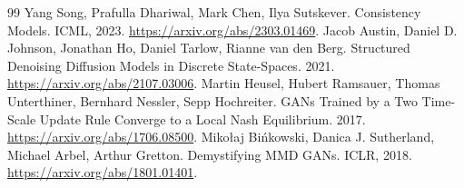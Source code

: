 \documentclass[UTF8,12pt,a4paper,fontset=fandol]{ctexart}
\begin{document}
\begin{thebibliography}{99}
 Yang Song, Prafulla Dhariwal, Mark Chen, Ilya Sutskever. Consistency Models. ICML, 2023. \url{https://arxiv.org/abs/2303.01469}.
 Jacob Austin, Daniel D. Johnson, Jonathan Ho, Daniel Tarlow, Rianne van den Berg. Structured Denoising Diffusion Models in Discrete State-Spaces. 2021. \url{https://arxiv.org/abs/2107.03006}.
 Martin Heusel, Hubert Ramsauer, Thomas Unterthiner, Bernhard Nessler, Sepp Hochreiter. GANs Trained by a Two Time-Scale Update Rule Converge to a Local Nash Equilibrium. 2017. \url{https://arxiv.org/abs/1706.08500}.
 Miko{\l}aj Bi\'nkowski, Danica J. Sutherland, Michael Arbel, Arthur Gretton. Demystifying MMD GANs. ICLR, 2018. \url{https://arxiv.org/abs/1801.01401}.
\end{thebibliography}
\end{document}
